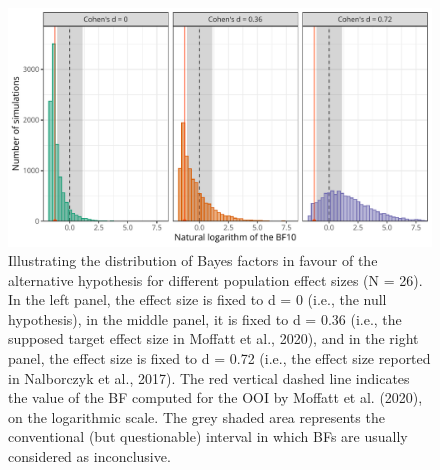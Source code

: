 \documentclass[
  man, donotrepeattitle,floatsintext]{apa6}
\begin{document}
\begin{figure}[!htb]

{\centering \includegraphics[width=1\linewidth]{manuscript_files/figure-latex/bf-dance-1} 

}

\caption{Illustrating the distribution of Bayes factors in favour of the alternative hypothesis for different population effect sizes (N = 26). In the left panel, the effect size is fixed to d = 0 (i.e., the null hypothesis), in the middle panel, it is fixed to d = 0.36 (i.e., the supposed target effect size in Moffatt et al., 2020), and in the right panel, the effect size is fixed to d = 0.72 (i.e., the effect size reported in Nalborczyk et al., 2017). The red vertical dashed line indicates the value of the BF computed for the OOI by Moffatt et al. (2020), on the logarithmic scale. The grey shaded area represents the conventional (but questionable) interval in which BFs are usually considered as inconclusive.}\label{fig:bf-dance}
\end{figure}
\end{document}
